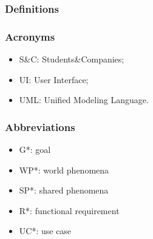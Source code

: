 \renewcommand{\arraystretch}{1.5}
\subsubsection{Definitions}
\subsubsection{Acronyms}
\begin{itemize}
    \item S\&C: Students\&Companies;
    \item UI: User Interface;
    \item UML: Unified Modeling Language.
\end{itemize}
\subsubsection{Abbreviations}
\begin{itemize}
    \item G*: goal
    \item WP*: world phenomena
    \item SP*: shared phenomena
    \item R*: functional requirement
    \item UC*: use case
\end{itemize}